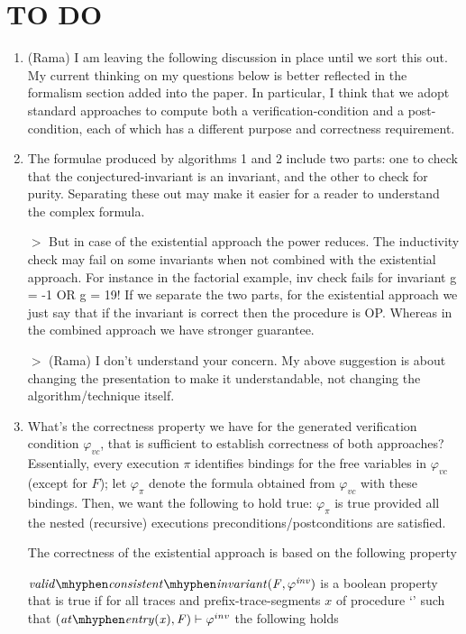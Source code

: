 \section*{TO DO}

\begin{enumerate}

\item (Rama) I am leaving the following discussion in place until we sort this out.
My current thinking on my questions below is better reflected in the formalism
section added into the paper. In particular, I think that we adopt standard
approaches to compute both a verification-condition and a post-condition,
each of which has a different purpose and correctness requirement.

\item The formulae produced by algorithms 1 and 2 include two parts:
one to check that the conjectured-invariant is an invariant, and the
other to check for purity. Separating these out may make it easier for
a reader to understand the complex formula.

$>$ But in case of the existential approach the power reduces. The
inductivity check may fail on some invariants when not combined with
the existential approach. For instance in the factorial example, inv
check fails for invariant g = -1 OR g = 19! If we separate the two
parts, for the existential approach we just say that if the invariant
is correct then the procedure is OP. Whereas in the combined approach
we have stronger guarantee. 

$>$ (Rama) I don't understand your concern. My above suggestion
is about changing the presentation to make it understandable, not changing
the algorithm/technique itself.

\item What's the correctness property we have for the generated verification
condition $\varphi_{vc}$, that is sufficient to establish correctness of both approaches?
Essentially, every execution $\pi$ identifies bindings for the free variables in $\varphi_{vc}$ (except for $F$);
let $\varphi_\pi$ denote the formula obtained from $\varphi_{vc}$ with these bindings.
Then, we want the following to hold true: $\varphi_\pi$ is true provided all the
nested (recursive) executions preconditions/postconditions are satisfied.

The correctness of the existential approach is based on the following property

\begin{definition}
  \label{def:validConsistentInvariant}
  $\\\vci{\F}{\inv}$ is a boolean property that is true if for all
  traces and prefix-trace-segments $x$ of procedure `\foo' such that
  $(\atEntry{x}, \F) \satisfies \inv$ the following holds


\end{definition}
\end{enumerate}
